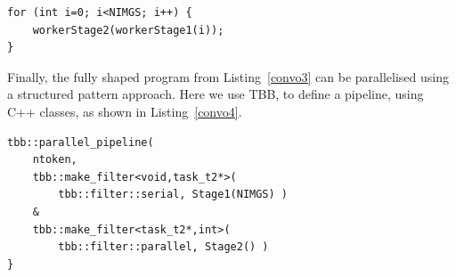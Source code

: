 \begin{lstlisting}[label=convo3,caption={Convolution Shaped},frame=single]
for (int i=0; i<NIMGS; i++) {
	workerStage2(workerStage1(i));
}
\end{lstlisting}

Finally, the fully shaped program from Listing~\ref{convo3} can be parallelised using a structured pattern approach. Here we use TBB, to define a pipeline, using C++ classes, as shown in Listing~\ref{convo4}.


\begin{lstlisting}[label=convo4, caption={Convolution Restored with TBB},frame=single]
tbb::parallel_pipeline(
	ntoken,
	tbb::make_filter<void,task_t2*>(
		tbb::filter::serial, Stage1(NIMGS) )
	&
	tbb::make_filter<task_t2*,int>(
		tbb::filter::parallel, Stage2() )
}
\end{lstlisting}


